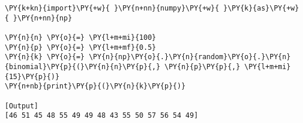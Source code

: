 \begin{Verbatim}[label=\makebox{\href{https://github.com/unipi-physics-labs/statnotes/tree/main/snippy/np.random.binomial.py}{https://github.com/.../np.random.binomial.py}},commandchars=\\\{\}]
\PY{k+kn}{import}\PY{+w}{ }\PY{n+nn}{numpy}\PY{+w}{ }\PY{k}{as}\PY{+w}{ }\PY{n+nn}{np}

\PY{n}{n} \PY{o}{=} \PY{l+m+mi}{100}
\PY{n}{p} \PY{o}{=} \PY{l+m+mf}{0.5}
\PY{n}{k} \PY{o}{=} \PY{n}{np}\PY{o}{.}\PY{n}{random}\PY{o}{.}\PY{n}{binomial}\PY{p}{(}\PY{n}{n}\PY{p}{,} \PY{n}{p}\PY{p}{,} \PY{l+m+mi}{15}\PY{p}{)}
\PY{n+nb}{print}\PY{p}{(}\PY{n}{k}\PY{p}{)}

[Output]
[46 51 45 48 55 49 49 48 43 55 50 57 56 54 49]
\end{Verbatim}
